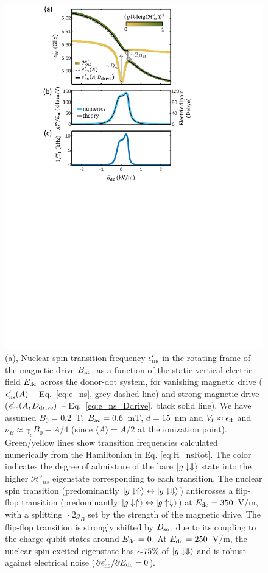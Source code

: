 \begin{figure}
\centering
	\includegraphics[width=0.9\columnwidth]{fig3_clock_v2}
	\caption{
(a), Nuclear spin transition frequency $\epsilon'_{\rm ns}$ in the rotating frame of the magnetic drive $B_{\rm ac}$, as a function of the static vertical electric field $E_{\rm dc}$ across the donor-dot system, for vanishing magnetic drive ($\epsilon'_{\rm ns}(A)$ -- Eq.~\ref{eq:e_ns}, grey dashed line) and strong magnetic drive ($\epsilon'_{\rm ns}(A,D_{\rm drive})$ -- Eq.~\ref{eq:e_ns_Ddrive}, black solid line). We have assumed $B_0=0.2$~T, $B_{\rm ac}=0.6$~mT, $d=15$~nm and $V_t\approx \epsilon_{\rm ff}$ and $\nu_B\approx\gamma_eB_0-A/4$ (since $\langle A \rangle = A/2$ at the ionization point). Green/yellow lines show transition frequencies calculated numerically from the Hamiltonian in Eq. \ref{eq:H_nsRot}. The color indicates the degree of admixture of the bare $|g\downarrow\Downarrow\rangle$ state into the higher $\mathcal{H}'_{ns}$ eigenstate corresponding to each transition. The nuclear spin transition (predominantly $|g\downarrow\Uparrow\rangle\leftrightarrow|g\downarrow\Downarrow\rangle$) anticrosses a flip-flop transition (predominantly $|g\downarrow\Uparrow\rangle\leftrightarrow|g\uparrow\Downarrow\rangle$) at $E_{\rm dc}=350$~V/m, with a splitting $\sim2g_B$ set by the strength of the magnetic drive. The flip-flop transition is strongly shifted by $D_{\rm so}$, due to its coupling to the charge qubit states around $E_{\rm dc}=0$. At $E_{\rm dc}=250$~V/m, the nuclear-spin excited eigenstate has $\sim75\%$ of $|g\downarrow\Downarrow\rangle$ and is robust against electrical noise ($\partial\epsilon'_{\rm ns}/\partial E_{\rm dc}=0$).
}
\end{figure}
